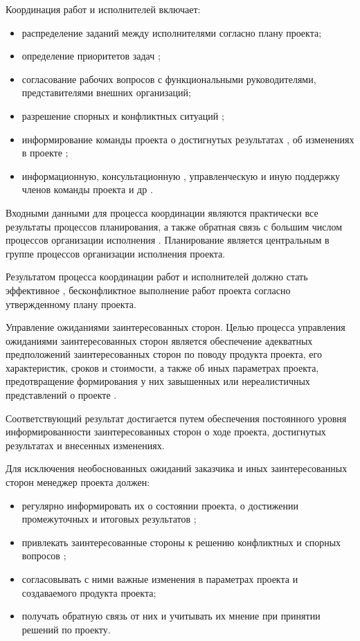Координация работ и исполнителей включает:
\begin{itemize}
	\item распределение заданий между исполнителями согласно плану про­екта;
	\item определение приоритетов задач ;
	\item согласование рабочих вопросов с функциональными руководите­лями, представителями внешних организаций;
	\item разрешение спорных и конфликтных ситуаций ;
	\item информирование команды проекта о достигнутых результатах , об изменениях в проекте ;
	\item информационную, консультационную , управленческую и иную поддержку членов команды проекта и др .
\end{itemize}

Входными данными для процесса координации являются практи­чески все результаты процессов планирования, а также обратная связь с большим числом процессов организации исполнения .
Планирование является центральным в группе процессов организации исполнения проекта.

Результатом процесса координации работ и исполнителей должно стать эффективное , бесконфликтное выполнение работ проекта со­гласно утвержденному плану проекта.

Управление ожиданиями заинтересованных сторон.
Целью процесса управления ожиданиями заинтересованных сторон является обеспечение адекватных предположений заинтересованных сторон по поводу продукта проекта, его характеристик, сроков и стои­мости, а также об иных параметрах проекта, предотвращение фор­мирования у них завышенных или нереалистичных представлений о проекте .

Соответствующий результат достигается путем обеспечения посто­янного уровня информированности заинтересованных сторон о ходе проекта, достигнутых результатах и внесенных изменениях.

Для исключения необоснованных ожиданий заказчика и иных за­интересованных сторон менеджер проекта должен:
\begin{itemize}
	\item регулярно информировать их о состоянии проекта, о достижении промежуточных и итоговых результатов ;
	\item привлекать заинтересованные стороны к решению конфликтных и спорных вопросов ;
	\item согласовывать с ними важные изменения в параметрах проекта и создаваемого продукта проекта;
	\item получать обратную связь от них и учитывать их мнение при при­нятии решений по проекту.
\end{itemize}

